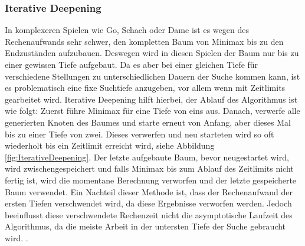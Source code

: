 \documentclass[12pt,a4paper,bibliography=totocnumbered,listof=totocnumbered]{article}
\begin{document}

\subsubsection{Iterative Deepening}
\label{chap:IterativeDeepening}
In komplexeren Spielen wie Go, Schach oder Dame ist es wegen des Rechenaufwands sehr schwer, den kompletten Baum von Minimax bis zu den
Endzuständen aufzubauen. Deswegen wird in diesen Spielen der Baum nur bis zu einer gewissen Tiefe aufgebaut. Da es aber bei einer gleichen
Tiefe für verschiedene Stellungen zu unterschiedlichen Dauern der Suche kommen kann, ist es problematisch eine fixe Suchtiefe anzugeben, 
vor allem wenn mit Zeitlimits gearbeitet wird. Iterative Deepening hilft hierbei, der Ablauf des Algorithmus ist wie folgt:
Zuerst führe Minimax für eine Tiefe von eins aus. Danach, verwerfe alle generierten Knoten des Baumes und starte erneut von Anfang, aber dieses
Mal bis zu einer Tiefe von zwei. Dieses verwerfen und neu starteten wird so oft wiederholt bis ein Zeitlimit erreicht wird, siehe Abbildung \ref{fig:IterativeDeepening}. 
Der letzte aufgebaute Baum, bevor neugestartet wird, wird zwischengespeichert und falls Minimax bis zum Ablauf des Zeitlimits nicht fertig ist,
wird die momentane Berechnung verworfen und der letzte gespeicherte Baum verwendet. Ein Nachteil dieser Methode ist, dass 
der Rechenaufwand der ersten Tiefen verschwendet wird, da diese Ergebnisse verworfen werden. Jedoch beeinflusst diese 
verschwendete Rechenzeit nicht die asymptotische Laufzeit des Algorithmus, da die meiste Arbeit in der untersten Tiefe der 
Suche gebraucht wird. \cite{IterativeDeepening}.
\end{document}
